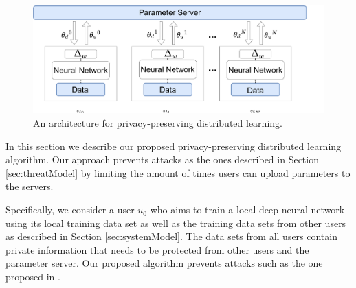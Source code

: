 \documentclass[conference]{IEEEtran}
\begin{document}
\begin{figure}[t]
\includegraphics[width=\textwidth, keepaspectratio]{HighLevelArch}
\caption{An architecture for privacy-preserving distributed learning.}
\label{fig:HighLevel}
\end{figure}

In this section we describe our proposed privacy-preserving distributed learning algorithm. Our approach prevents attacks as the ones
described in Section \ref{sec:threatModel} by limiting the amount of times users can upload parameters to the servers. 




Specifically, we consider a user $u_0$ who aims to train a local deep neural network using its local training data set as well as the
training data sets from other users as described in Section \ref{sec:systemModel}. The data sets from all users contain private
information that needs to be protected from other users and the parameter server. Our proposed algorithm prevents attacks such as the
one proposed in \cite{hitaj2017deep}. 
\end{document}
